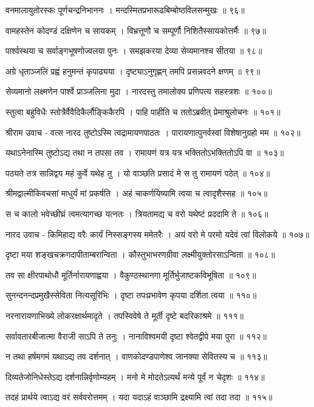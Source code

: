 वनमालायुतोरस्कः पूर्णचन्द्रनिभाननः ।
मन्दस्मितप्रभारूढबिम्बोष्ठविलसन्मुखः ॥ ९६॥

वामहस्तेन कोदण्डं दक्षिणेन च सायकम् ।
विभ्रत्तूणौ च सम्पूर्णौ निशितैस्सायकोत्तर्मैः ॥ ९७॥

पार्श्वस्थया च सर्वाङ्गभूषणोज्वलया पुनः ।
समझकरया देव्या सेव्यमानश्च सीतया ॥ ९८॥

अग्रे धृताञ्जलिं प्रह्वं हनुमन्तं कृपाढ्यया ।
दृष्ट्याऽनुगृह्णन् तमपि प्रसन्नवदने क्षणम् ॥ ९९॥

सेव्यमानो लक्ष्मणेन पार्श्वे प्राञ्जलिना मुदा ।
नारदस्तु तमालोक्य प्रणिपत्य सहस्त्रशः ॥ १००॥

स्तुत्वा बहुविधैः स्तोत्रैर्वैवैदिकैर्लौङ्किकैरपि ।
पाहि पाहीति च ततोऽब्रवीत् प्रेमाश्रुलोचनः ॥ १०१॥

श्रीराम उवाच -
वत्स नारद तुष्टोऽस्मि त्वद्रामायणपाठतः ।
पारायणात्पुनर्वस्वां विशेषानुग्रहो मम ॥ १०२॥

यथाऽनेनास्मि तुष्टोऽद्य तथा न तपसा तव ।
रामायणं यत्र यत्र भक्तितोऽभक्तितोऽपि वा ॥ १०३॥

पठ्यते तत्र सान्निद्वय महं कुर्वे यथेह तु ।
यो वाञ्छति प्रसादं मे स तु रामायणं पठेत् ॥ १०४॥

श्रीमद्वाल्मीकिवचसां माधुर्यं मां प्रकर्षति ।
अहं चाकर्णयिष्यामि त्वया च त्वादृशैस्सह ॥ १०५॥

स च कालो भवेच्छीघ्रं त्वमत्यागच्छ यत्नतः ।
त्रियतामद्य च वरो यथेष्टं प्रददामि ते ॥ १०६॥

नारद उवाच -
किमिहाद्य वरैः कार्यं निस्सङ्गस्य ममेतरैः ।
अयं वरो मे परमो यदेवं त्वां विलोकये ॥ १०७॥

दृष्टा मया शङ्खचक्रगदापीताम्बरान्विता ।
कौस्तुभाभरणग्रीवा लक्ष्मीयुक्तोरसाऽन्विता ॥ १०८॥

तव सा क्षीरपाथोधौ मूर्तिर्नारायणाह्वया ।
वैकुण्ठस्थानगा मूर्तिर्भुजाष्टकविभूषिता ॥ १०९॥

सुनन्दनन्दप्रमुखैस्सेविता नित्यसूरिभिः ।
दृष्टा तपःप्रभावेण कृपया दर्शिता त्वया ॥ ११०॥

नरनारायणाभिख्ये लोकरक्षार्थमादृते ।
तपस्विवेषे ते मूर्ती दृष्टे बदरिकाश्रमे ॥ १११॥

सर्वावतारबीजात्मा वैराजी साऽपि ते तनुः ।
नानाविश्वमयी दृष्टा श्वेतद्वीपे मया पुरा ॥ ११२॥

न तथा हर्षमगमं यथाऽद्य तव दर्शनात् ।
वाणकोदण्डपाणेश्व जानक्या सेवितस्य च ॥ ११३॥

दिव्यतेजोनिधेस्तेऽद्य दर्शनान्निर्वृणोम्यहम् ।
मनो मे मोदतेऽत्यर्थं मन्ये पूर्वं न चेदृशः ॥ ११४॥

तदहं प्रार्थये त्वाऽद्य वरं सर्ववरोत्तमम् ।
यदा यदाऽहं वाञ्छामि द्रक्ष्यामि त्वां तदा तदा ॥ ११५॥


